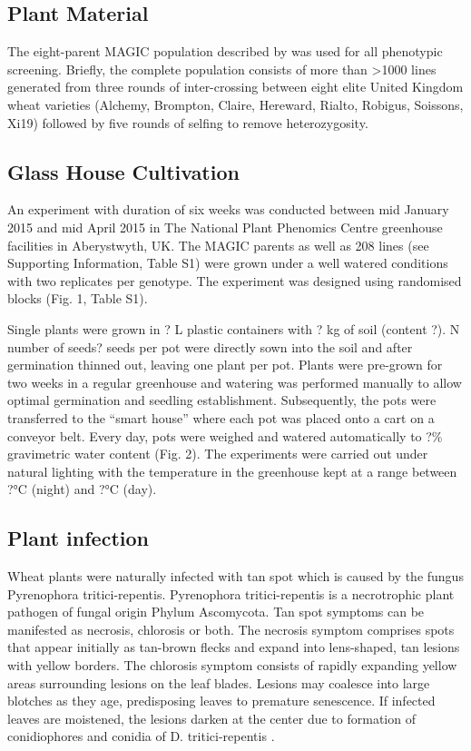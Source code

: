 \documentclass{frontiersSCNS} %
\begin{document}
\subsection{Plant Material}
The eight-parent MAGIC population described by \cite{Mackay01092014} was used for all phenotypic screening. Briefly, the complete population consists of more than >1000 lines generated from three rounds of inter-crossing between eight elite United Kingdom wheat varieties (Alchemy, Brompton, Claire, Hereward, Rialto, Robigus, Soissons, Xi19) followed by five rounds of selfing to remove heterozygosity. 

\subsection{Glass House Cultivation}
An experiment with duration of six weeks was conducted between mid January 2015 and mid April 2015 in The National Plant Phenomics Centre greenhouse facilities in Aberystwyth, UK. The MAGIC parents as well as 208 lines (see Supporting Information, Table S1) were grown under a well watered conditions with two replicates per genotype. The experiment was designed using randomised blocks (Fig. 1, Table S1).

Single plants were grown in ? L plastic containers with ? kg of soil (content ?). N number of seeds? seeds per pot were directly sown into the soil and after germination thinned out, leaving one plant per pot. Plants were pre-grown for two weeks in a regular greenhouse and watering was performed manually to allow optimal germination and seedling establishment. Subsequently, the pots were transferred to the “smart house” where each pot was placed onto a cart on a conveyor belt. Every day, pots were weighed and watered automatically to ?\% gravimetric water content (Fig. 2). The experiments were carried out under natural lighting with the temperature in the greenhouse kept at a range between ?°C (night) and ?°C (day).

\subsection{Plant infection}
Wheat plants were naturally infected with tan spot which is caused by the fungus Pyrenophora tritici-repentis. Pyrenophora tritici-repentis is a necrotrophic plant pathogen of fungal origin Phylum Ascomycota. Tan spot symptoms can be manifested as necrosis, chlorosis or both. The necrosis symptom comprises spots that appear initially as tan-brown flecks and expand into lens-shaped, tan lesions with yellow borders. The chlorosis symptom consists of rapidly expanding yellow areas surrounding lesions on the leaf blades. Lesions may coalesce into large blotches as they age, predisposing leaves to premature senescence.  If infected leaves are moistened, the lesions darken at the center due to formation of conidiophores and conidia of D. tritici-repentis \cite{Singh2009}. 
\end{document}
